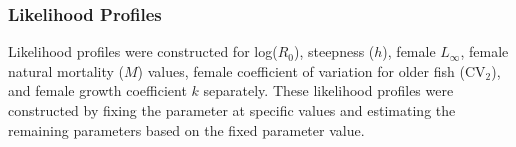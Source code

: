 \documentclass[11pt,
  english,
  a4paper,
]{article}
\begin{document}
\leavevmode\tagmcend\tagstructend\par


\hypertarget{likelihood-profiles}{%
\subsubsection{Likelihood Profiles}\label{likelihood-profiles}}

\leavevmode\tagmcend\tagstructend


Likelihood profiles were constructed for log({\(R_0\)\leavevmode\tagmcend\tagstructend}), steepness ({\(h\)\leavevmode\tagmcend\tagstructend}), female {\(L_{\infty}\)\leavevmode\tagmcend\tagstructend}, female natural mortality ({\(M\)\leavevmode\tagmcend\tagstructend}) values, female coefficient of variation for older fish ({\(\text{CV}_2\)\leavevmode\tagmcend\tagstructend}), and female growth coefficient {\(k\)\leavevmode\tagmcend\tagstructend} separately. These likelihood profiles were constructed by fixing the parameter at specific values and estimating the remaining parameters based on the fixed parameter value.

\leavevmode\tagmcend\tagstructend\par

\end{document}
